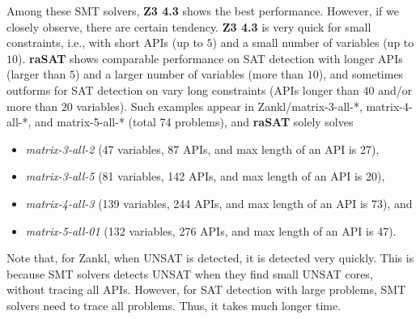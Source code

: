 \documentclass[runningheads,a4paper,oribibl]{llncs}
\begin{document}
Among these SMT solvers, {\bf Z3 4.3} shows the best performance. 
However, if we closely observe, there are certain tendency. 
{\bf Z3 4.3} is very quick for small constraints, i.e., with 
short APIs (up to $5$) and a small number of variables (up to $10$). 
{\bf raSAT} shows comparable performance on SAT detection with 
longer APIs (larger than $5$) and a larger number of variables (more than $10$), 
and sometimes outforms for SAT detection on vary long constraints 
(APIs longer than $40$ and/or more than $20$ variables). 
Such examples appear in Zankl/matrix-3-all-*, matrix-4-all-*, and matrix-5-all-* 
(total 74 problems), and {\bf raSAT} solely solves 
\begin{itemize}
\item {\em matrix-3-all-2} (47 variables, 87 APIs, and max length of an API is 27), 
\item {\em matrix-3-all-5} (81 variables, 142 APIs, and max length of an API is 20), 
\item {\em matrix-4-all-3} (139 variables, 244 APIs, and max length of an API is 73), and 
\item {\em matrix-5-all-01} (132 variables, 276 APIs, and max length of an API is 47). 
\end{itemize}
Note that, for Zankl, when UNSAT is detected, it is detected very quickly. 
This is because SMT solvers detects UNSAT when they find small UNSAT cores, 
without tracing all APIs. However, for SAT detection with large problems, 
SMT solvers need to trace all problems. Thus, it takes much longer time. 
\end{document}

